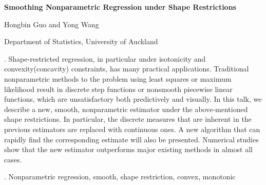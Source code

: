\documentclass[12pt]{article}
\begin{document}
\begin{flushleft}


{\LARGE\bf Smoothing Nonparametric Regression under Shape Restrictions}


\vspace{1.0cm}

Hongbin Guo and Yong Wang

\begin{description}

\item Department of Statistics, University of Auckland


\end{description}

\end{flushleft}


\vspace{0.75cm}

. Shape-restricted regression, in particular under isotonicity and convexity(concavity) constraints, has many practical applications. Traditional nonparametric methods to the problem using least squares or maximum likelihood result in discrete step functions or nonsmooth piecewise linear functions, which are unsatisfactory both predictively and visually. In this talk, we describe a new, smooth, nonparametric estimator under the above-mentioned shape restrictions. In particular, the discrete measures that are inherent in the previous estimators are replaced with continuous ones. A new algorithm that can rapidly find the corresponding estimate will also be presented. Numerical studies show that the new estimator outperforms major existing methods in almost all cases.

\vskip 2mm

.
Nonparametric regression, smooth, shape restriction, convex, monotonic
\end{document}
